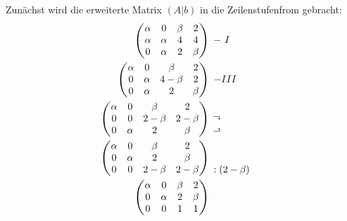 Zunächst wird die erweiterte Matrix $\displaystyle ( A|b)$ in die Zeilenstufenfrom gebracht:
\begin{align*}
	\begin{pmatrix}
		\alpha  & 0 & \beta  & 2\\
		\alpha  & \alpha  & 4 & 4\\
		0 & \alpha  & 2 & \beta 
	\end{pmatrix} & \begin{array}{ l c }
		& \\
		-\ I & \\
		& 
	\end{array}\\
	\begin{pmatrix}
		\alpha  & 0 & \beta  & 2\\
		0 & \alpha  & 4-\beta  & 2\\
		0 & \alpha  & 2 & \beta 
	\end{pmatrix} & \begin{array}{ l c }
		& \\
		-III & \\
		& 
	\end{array}\\
	\begin{pmatrix}
		\alpha  & 0 & \beta  & 2\\
		0 & 0 & 2-\beta  & 2-\beta \\
		0 & \alpha  & 2 & \beta 
	\end{pmatrix} & \begin{array}{ l c }
		& \\
		\rotatebox[origin=c]{270}{$\Rsh$}  & \\
		\rotatebox[origin=c]{270}{$\Lsh$}  & 
	\end{array}\\
	\begin{pmatrix}
		\alpha  & 0 & \beta  & 2\\
		0 & \alpha  & 2 & \beta \\
		0 & 0 & 2-\beta  & 2-\beta 
	\end{pmatrix} & \begin{array}{ l c }
		& \\
		& \\
		:( 2-\beta ) & 
	\end{array}\\
	\begin{pmatrix}
		\alpha  & 0 & \beta  & 2\\
		0 & \alpha  & 2 & \beta \\
		0 & 0 & 1 & 1
	\end{pmatrix} & \begin{array}{ l c }

\end{array}
\end{align*}
